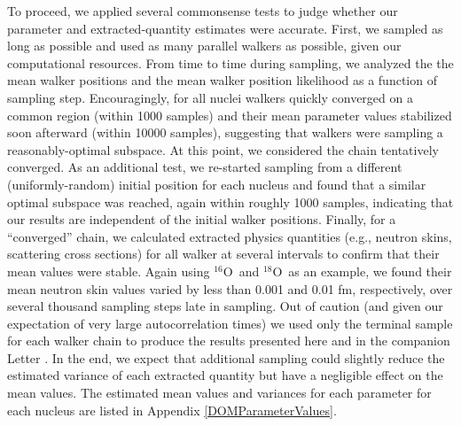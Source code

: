 \documentclass[twocolumn,secnumarabic,amssymb, nobibnotes, aps, prl,
superscriptaddress, nobalancelastpage]{revtex4}
\newcommand{\oSix}{\ensuremath{^{16}}O}
\newcommand{\oEight}{\ensuremath{^{18}}O}
\begin{document}
To proceed, we applied several commonsense tests to
judge whether our parameter and extracted-quantity estimates were accurate.
First, we sampled as long as possible and used as many parallel walkers as
possible, given our computational resources. From time to time during sampling,
we analyzed the the mean walker positions and the mean walker position likelihood
as a function of sampling step. Encouragingly, for all nuclei walkers quickly
converged on a common region (within 1000 samples) and their mean parameter
values stabilized soon afterward (within 10000 samples), suggesting that walkers
were sampling a reasonably-optimal subspace. At this point, we considered the chain
tentatively converged. As an additional test, we re-started sampling from a different
(uniformly-random) initial position for each nucleus and found that a similar
optimal subspace was reached, again within roughly 1000 samples, indicating that
our results are independent of the initial walker positions. Finally, for a
``converged'' chain, we calculated extracted physics quantities (e.g., neutron
skins, scattering cross sections) for all walker at several intervals
to confirm that their mean values were stable. Again using \oSix\ and \oEight\ as
an example, we found their mean neutron skin values varied by less
than 0.001 and 0.01 fm, respectively, over several thousand sampling steps late
in sampling. Out of caution (and given our expectation of very large autocorrelation times)
we used only the terminal sample for each walker chain to produce
the results presented here and in the companion Letter \cite{Pruitt2020PRL}.
In the end, we expect that additional sampling could slightly
reduce the estimated variance of each extracted quantity but have a negligible
effect on the mean values. The estimated mean values and variances for each
parameter for each nucleus are listed in Appendix \ref{DOMParameterValues}.
\end{document}
